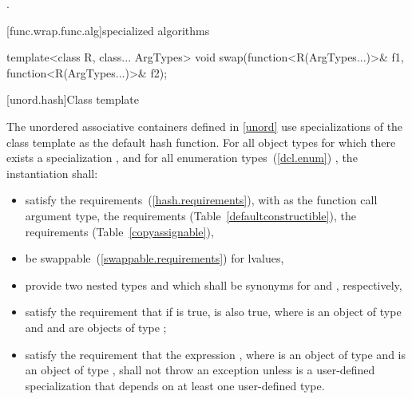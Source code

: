 \begin{itemdescr}
\pnum\returns {}.
\end{itemdescr}

[func.wrap.func.alg]{specialized algorithms}

%
%
\begin{itemdecl}
template<class R, class... ArgTypes>
  void swap(function<R(ArgTypes...)>& f1, function<R(ArgTypes...)>& f2);
\end{itemdecl}

\begin{itemdescr}
\pnum\effects {}
\end{itemdescr}%

[unord.hash]{Class template }

\pnum
{}%
%
The unordered associative containers defined in \ref{unord} use
specializations of the class template  as the default hash function.
For all object types  for which there exists a specialization ,
and for all enumeration types~(\ref{dcl.enum}) ,
the instantiation  shall:

\begin{itemize}
\item satisfy the  requirements~(\ref{hash.requirements}),
with  as the function
call argument type, the  requirements (Table~\ref{defaultconstructible}),
the  requirements (Table~\ref{copyassignable}),
\item be swappable~(\ref{swappable.requirements}) for lvalues,
\item provide two nested types  and  which shall be
synonyms for  and , respectively,
\item satisfy the requirement that if  is true,  is
also true, where  is an object of type  and  and 
are objects of type ;
\item satisfy the requirement that the expression , where 
is an object of type  and  is an object of type
, shall not throw an exception unless  is a
user-defined specialization that depends on at least one user-defined type.
\end{itemize}

